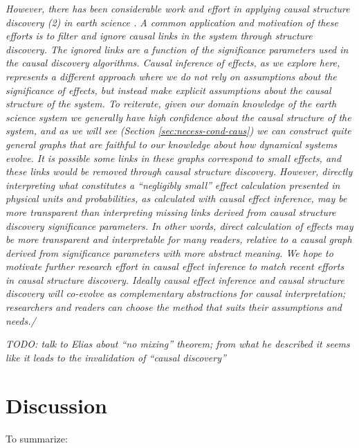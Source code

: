 \documentclass[12pt]{article}
\begin{document}
\textit{
  However, there has been considerable work and effort in applying
  causal structure discovery (2) in earth science
  \citep[e.g.,][]{ebert-uphoff2012,
    samarasinghe-casuality,runge-causal-timeseries,runge2019inferring}. A
  common application and motivation of these efforts is to filter and
  ignore causal links in the system through structure discovery. The
  ignored links are a function of the significance parameters used in
  the causal discovery algorithms. Causal inference of effects, as we
  explore here, represents a different approach where we do not rely on
  assumptions about the significance of effects, but instead make
  explicit assumptions about the causal structure of the system. To
  reiterate, given our domain knowledge of the earth science system we
  generally have high confidence about the causal structure of the
  system, and as we will see (Section \ref{sec:necess-cond-caus}) we can
  construct quite general graphs that are faithful to our knowledge
  about how dynamical systems evolve. It is possible some links in these
  graphs correspond to small effects, and these links would be removed
  through causal structure discovery. However, directly interpreting
  what constitutes a ``negligibly small'' effect calculation presented in
  physical units and probabilities, as calculated with causal effect
  inference, may be more transparent than interpreting missing links
  derived from causal structure discovery significance parameters. In
  other words, direct calculation of effects may be more transparent and
  interpretable for many readers, relative to a causal graph derived
  from significance parameters with more abstract meaning. We hope to
  motivate further research effort in causal effect inference to match
  recent efforts in causal structure discovery. Ideally causal effect
  inference and causal structure discovery will co-evolve as
  complementary abstractions for causal interpretation; researchers and
  readers can choose the method that suits their assumptions and
  needs./}

\textit{
  TODO: talk to Elias about ``no mixing'' theorem; from what he
  described it seems like it leads to the invalidation of ``causal
  discovery''
}

\section{Discussion}

To summarize:
\end{document}

